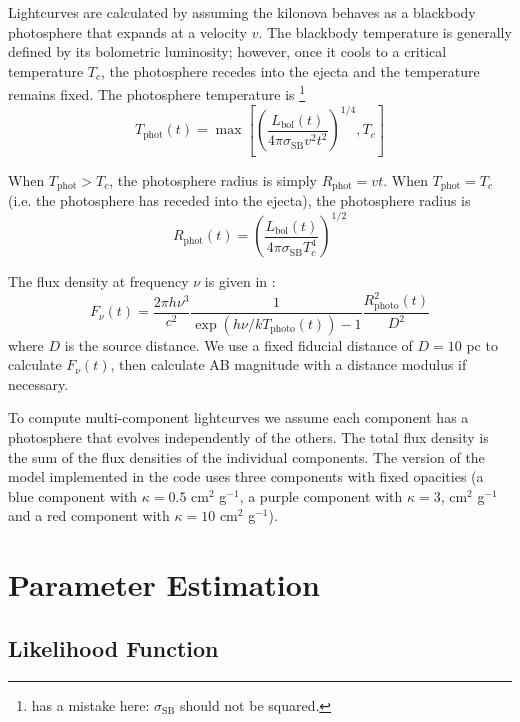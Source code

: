 \documentclass{article}
\begin{document}
Lightcurves are calculated by assuming the kilonova behaves as a blackbody photosphere that expands at a velocity $v$.
The blackbody temperature is generally defined by its bolometric luminosity; however, once it cools to a critical temperature $T_c$, the photosphere recedes into the ejecta and the temperature remains fixed.
The photosphere temperature is
\footnote{\cite{Villar_2017} has a mistake here: $\sigma_\text{SB}$ should not be squared.}
\begin{equation} \label{T_c}
    T_\text{phot}(t) = \max \left [ \left ( \frac {L_\text{bol}(t)} {4 \pi \sigma_\text{SB} v^2 t^2} \right )^{1/4}, T_c \right]
\end{equation}

When $T_\text{phot} > T_c$, the photosphere radius is simply $R_\text{phot} = v t$.
When $T_\text{phot} = T_c$ (i.e. the photosphere has receded into the ejecta), the photosphere radius is
\begin{equation}
    R_\text{phot}(t) = \left ( \frac {L_\text{bol}(t)} {4 \pi \sigma_\text{SB} T_c^4} \right )^{1/2}
\end{equation}

The flux density at frequency $\nu$ is given in \cite{Metzger_2017}:
\begin{equation}
    F_\nu(t) = \frac {2 \pi h \nu^3} {c^2} \frac {1} {\exp{(h \nu / k T_\text{photo}(t))} - 1} \frac {R_\text{photo}^2(t)} {D^2}
\end{equation}
where $D$ is the source distance.
We use a fixed fiducial distance of $D = 10$ pc to calculate $F_\nu(t)$, then calculate AB magnitude with a distance modulus if necessary.

To compute multi-component lightcurves we assume each component has a photosphere that evolves independently of the others.
The total flux density is the sum of the flux densities of the individual components.
The version of the model implemented in the code uses three components with fixed opacities (a blue component with $\kappa = 0.5$ cm$^2$ g$^{-1}$, a purple component with $\kappa = 3$, cm$^2$ g$^{-1}$ and a red component with $\kappa = 10$ cm$^2$ g$^{-1}$).

\section{Parameter Estimation}

\subsection{Likelihood Function}
\end{document}
